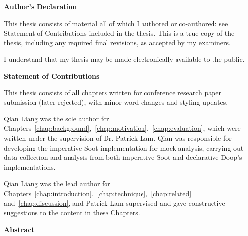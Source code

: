 \cleardoublepage %


 \begin{center}\textbf{Author's Declaration}\end{center}
  
 \noindent
This thesis consists of material all of which I authored or co-authored: see Statement of Contributions included in the thesis. This is a true copy of the thesis, including any required final revisions, as accepted by my examiners.

I understand that my thesis may be made electronically available to the public.

\cleardoublepage

\begin{center}\textbf{Statement of Contributions}\end{center}

This thesis consists of all chapters written for conference research paper submission (later rejected), with minor word changes and styling updates.

Qian Liang was the sole author for Chapters~\ref{chap:background},~\ref{chap:motivation},~\ref{chap:evaluation}, which were written under the supervision of Dr. Patrick Lam. Qian was responsible for developing the imperative Soot implementation for mock analysis, carrying out data collection and analysis from both imperative Soot and declarative Doop's implementations.

Qian Liang was the lead author for Chapters~\ref{chap:introduction},~\ref{chap:technique},~\ref{chap:related} and~\ref{chap:discussion}, and Patrick Lam supervised and gave constructive suggestions to the content in these Chapters. 

\cleardoublepage


\begin{center}\textbf{Abstract}\end{center}




